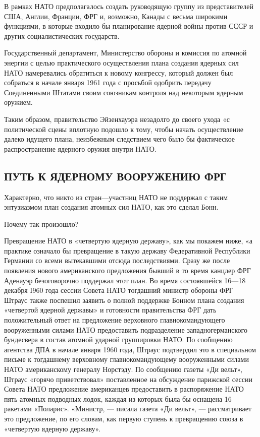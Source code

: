 \documentclass[12pt, a4paper, openany]{book}
\begin{document}
	В рамках НАТО предполагалось создать руководящую группу из представителей США, Англии, Франции, ФРГ и, возможно, Канады с весьма широкими функциями, в которые входило бы планирование ядерной войны против СССР и других социалистических государств.
	
	Государственный департамент, Министерство обороны и комиссия по атомной энергии с целью практического осуществления плана создания ядерных сил НАТО намеревались обратиться к новому конгрессу, который должен был собраться в начале января 1961 года с просьбой одобрить передачу Соединенными Штатами своим союзникам контроля над некоторым ядерным оружием.
	
	Таким образом, правительство Эйзенхауэра незадолго до своего ухода «с политической сцены вплотную подошло к тому, чтобы начать осуществление далеко идущего плана, неизбежным следствием чего было бы фактическое распространение ядерного оружия внутри НАТО.
	
		\subsection[Путь к ядерному вооружению ФРГ]{\center ПУТЬ К ЯДЕРНОМУ ВООРУЖЕНИЮ ФРГ}
	
	
	
	
	Характерно, что никто из стран—участниц НАТО не поддержал с таким энтузиазмом план создания атомных сил НАТО, как это сделал Бонн.
	
	Почему так произошло?
	
	Превращение НАТО в «четвертую ядерную державу», как мы покажем ниже, «а практике означало бы превращение в такую державу Федеративной Республики Германии со всеми вытекавшими отсюда последствиями. Сразу же после появления нового американского предложения бывший в то время канцлер ФРГ Аденауэр безоговорочно поддержал этот план. Во время состоявшейся 16—18 декабря I960 года сессии Совета НАТО тогдашний министр обороны ФРГ Штраус также поспешил заявить о полной поддержке Бонном плана создания «четвертой ядерной державы» и готовности правительства ФРГ дать положительный ответ на предложение верховного главнокомандующего вооруженными силами НАТО предоставить подразделение западногерманского бундесвера в состав атомной ударной группировки НАТО. По сообщению агентства ДПА в начале января 1960 года, Штраус подтвердил это в специальном письме к тогдашнему верховному главнокомандующему вооруженными силами НАТО американскому генералу Норстэду. По сообщению газеты «Ди вельт», Штраус «горячо приветствовал» поставленное на обсуждение парижской сессии Совета НАТО предложение американцев предоставить в распоряжение НАТО пять атомных подводных лодок, каждая из которых была бы оснащена 16 ракетами «Поларис». «Министр, — писала газета «Ди вельт», — рассматривает это предложение, по его словам, как первую ступень к превращению союза в «четвертую ядерную державу».
	
\end{document}
